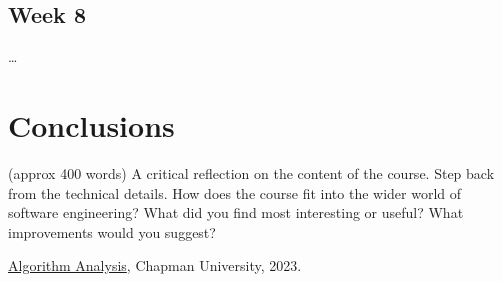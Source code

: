 \documentclass{article}
\theoremstyle{theorem}
\theoremstyle{definition}
\theoremstyle{remark}
\begin{document}
\subsection{Week 8}

\ldots

\section{Conclusions}\label{conclusions}

(approx 400 words) A critical reflection on the content of the course. Step back from the technical details. How does the course fit into the wider world of software engineering? What did you find most interesting or useful? 
What improvements would you suggest?

\begin{thebibliography}{99}
 \href{https://github.com/alexhkurz/algorithm-analysis-2023}{Algorithm Analysis}, Chapman University, 2023.
\end{thebibliography}
\end{document}
